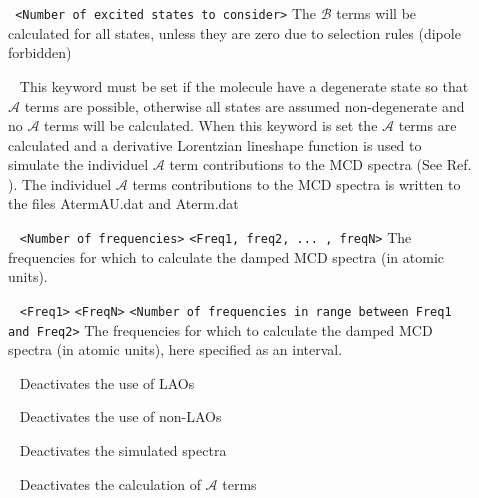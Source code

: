 \begin{description}
\item[] \verb| | \newline
\verb|<Number of excited states to consider>|\newline
The $\mathcal{B}$ terms will be calculated for all states, unless they are zero due to selection rules (dipole forbidden)
\item[] \verb| | \newline
This keyword must be set if the molecule have a degenerate state so that $\mathcal{A}$ terms are possible, otherwise all states are assumed non-degenerate and no $\mathcal{A}$ terms will be calculated. When this keyword is set the $\mathcal{A}$ terms are calculated and a derivative Lorentzian lineshape function is used to simulate the individuel $\mathcal{A}$ term contributions to the MCD spectra (See Ref. \cite{KjaergaardMCD}). The individuel $\mathcal{A}$ terms contributions to the MCD spectra is written to the files AtermAU.dat and Aterm.dat   
\item[] \verb| | \newline
\verb|<Number of frequencies>|\newline
\verb|<Freq1, freq2, ... , freqN>|\newline
The frequencies for which to calculate the damped MCD spectra (in atomic units).
\item[] \verb| | \newline
\verb|<Freq1>|\newline
\verb|<FreqN>|\newline
\verb|<Number of frequencies in range between Freq1 and Freq2>|\newline
The frequencies for which to calculate the damped MCD spectra (in atomic units), here specified as an interval.
\item[] \verb| | \newline
Deactivates the use of LAOs
\item[] \verb| | \newline
Deactivates the use of non-LAOs
\item[] \verb| | \newline
Deactivates the simulated spectra
\item[] \verb| | \newline
Deactivates the calculation of $\mathcal{A}$ terms
\item[] \verb| | \newline

\end{description}
